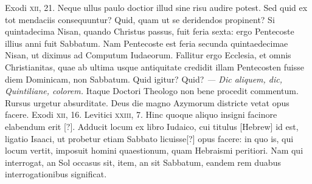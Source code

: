 Exodi \textsc{xii}, 21.
Neque ullus paulo doctior illud sine risu audire potest.
Sed quid ex tot mendaciis consequuntur?
Quid, quam ut se deridendos propinent?
Si quintadecima Nisan, quando Christus passus, fuit feria sexta:
 ergo Pentecoste
illius anni fuit Sabbatum.
Nam Pentecoste est feria secunda
quintaedecimae Nisan, ut diximus ad Computum Iudaeorum.
Fallitur ergo Ecclesia, et omnis Christianitas, quae ab ultima usque
 antiquitate
credidit illam Pentecosten fuisse diem Dominicam, non
Sabbatum.
Quid igitur?
Quid?
\textit{— Dic aliquem, dic, Quintiliane, colorem.}
Itaque Doctori Theologo non bene procedit commentum.
Rursus urgetur absurditate.
Deus die magno Azymorum districte
vetat opus facere.
Exodi \textsc{xii}, 16.
Levitici \textsc{xxiii}, 7.
Hinc quoque
aliquo insigni facinore elabendum erit [?].
Adducit locum ex libro Iudaico,
cui titulus \texthebrew{[Hebrew]} id est, ligatio Isaaci, ut probetur etiam
Sabbato licuisse[?] opus facere: in quo is, qui locum vertit, imposuit homini
quaestionum, quam Hebraismi peritiori.
Nam qui interrogat,
an Sol occasus sit, item, an sit Sabbatum, eandem rem duabus interrogationibus
significat.

